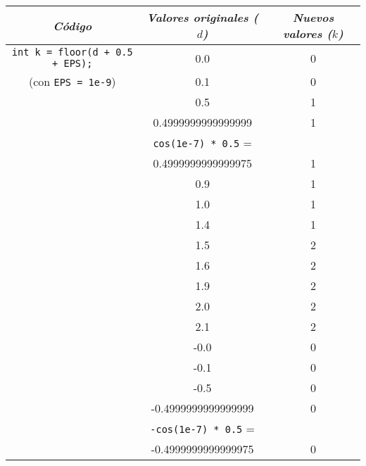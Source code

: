 \documentclass[10pt,letterpaper,twocolumn,twosided]{article}
\begin{document}
\begin{center}
  \renewcommand{\arraystretch}{1.3} %
  \begin{tabular}{| c | c | c | }
    \hline
    \textit{Código} & \textit{Valores originales ($d$)} & \textit{Nuevos valores ($k$)} \\
    \hline\hline

    \verb_int k = floor(d + 0.5 + EPS);_ & 0.0  & 0 \\ \cline{2-3}
    (con \verb_EPS = 1e-9_)              & 0.1  & 0 \\ \cline{2-3}
                                         & 0.5  & 1 \\ \cline{2-3}
                                         & 0.4999999999999999 & 1 \\ \cline{2-3}
                                         & \verb_cos(1e-7) * 0.5_ =  & \\ & 0.4999999999999975 & 1 \\ \cline{2-3}
                                         & 0.9  & 1 \\ \cline{2-3}
                                         & 1.0 & 1 \\ \cline{2-3}
                                         & 1.4 & 1 \\ \cline{2-3}
                                         & 1.5 & 2 \\ \cline{2-3}
                                         & 1.6 & 2 \\ \cline{2-3}
                                         & 1.9 & 2 \\ \cline{2-3}
                                         & 2.0 & 2 \\ \cline{2-3}
                                         & 2.1 & 2 \\ \cline{2-3}
                                         & -0.0  & 0 \\ \cline{2-3}
                                         & -0.1  & 0 \\ \cline{2-3}
                                         & -0.5  & 0 \\ \cline{2-3}
                                         & -0.4999999999999999 & 0 \\ \cline{2-3}
                                         & \verb_-cos(1e-7) * 0.5_ =  & \\ & -0.4999999999999975 & 0 \\ \cline{2-3}

\end{tabular}
\end{center}
\end{document}

